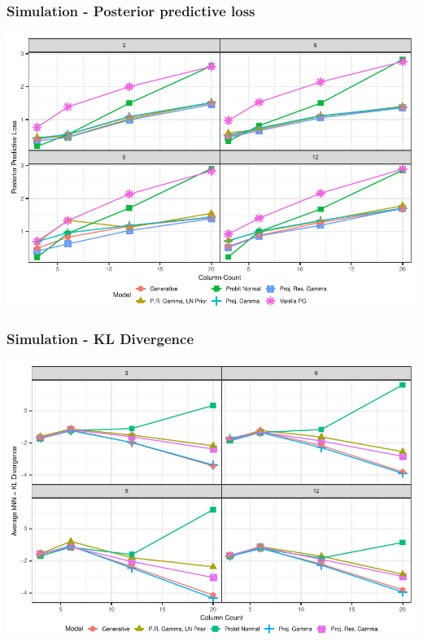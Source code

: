 \documentclass[aspectratio=169]{beamer}
\newlength{\frametextheight}
\begin{document}
\begin{frame}
  \frametitle{Simulation - Posterior predictive loss}
  \begin{center}
    \includegraphics[height=\frametextheight]{./images/simulation_ppl}
  \end{center}
\end{frame}
\begin{frame}
  \frametitle{Simulation - KL Divergence}
  \begin{center}
    \includegraphics[height=\frametextheight]{./images/simulation_knn_kld}
  \end{center}
\end{frame}
\end{document}
